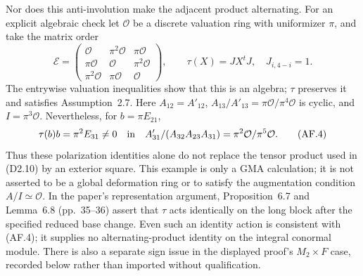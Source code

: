 \documentclass[11pt,a4paper]{article}
\theoremstyle{definition}
\begin{document}
Nor does this anti-involution make the adjacent product alternating.
For an explicit algebraic check let $\mathcal O$ be a discrete valuation
ring with uniformizer $\pi$, and take the matrix order
\[
 \mathcal E=
 \begin{pmatrix}
 \mathcal O&\pi^2\mathcal O&\pi\mathcal O\\
 \pi\mathcal O&\mathcal O&\pi^2\mathcal O\\
 \pi^2\mathcal O&\pi\mathcal O&\mathcal O
 \end{pmatrix},\qquad \tau(X)=JX^tJ,\quad J_{i,4-i}=1.        \tag{AF.3}
\]
The entrywise valuation inequalities show that this is an algebra;
$\tau$ preserves it and satisfies Assumption~2.7.  Here
$A_{12}=A'_{12}$, $A_{13}/A'_{13}=\pi\mathcal O/\pi^4\mathcal O$
is cyclic, and $I=\pi^3\mathcal O$.  Nevertheless, for
$b=\pi E_{21}$,
\[
 \tau(b)b=\pi^2E_{31}\ne0
 \quad\hbox{in}\quad
 A'_{31}/(A_{32}A_{23}A_{31})
       =\pi^2\mathcal O/\pi^5\mathcal O.                    \tag{AF.4}
\]
Thus these polarization identities alone do not replace the tensor
product used in (D2.10) by an exterior square.  This example is only a
GMA calculation; it is not asserted to be a global deformation ring
or to satisfy the augmentation condition $A/I\simeq\mathcal O$.
In the paper's representation argument, Proposition~6.7 and
Lemma~6.8 (pp.~35--36) assert that $\tau$ acts identically on the
long block after the specified reduced base change.  Even such an
identity action is consistent with (AF.4); it supplies no
alternating-product identity on the integral conormal module.
There is also a separate sign issue in the displayed proof's
$M_2\times F$ case, recorded below rather than imported without
qualification.
\end{document}
